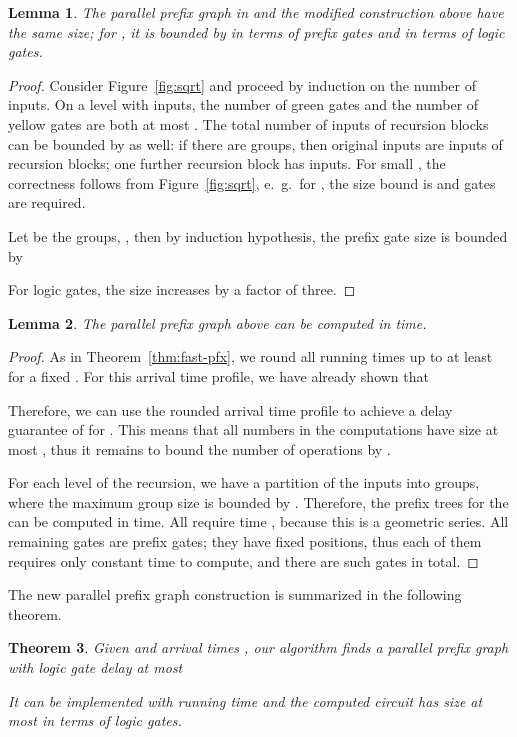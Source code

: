 \documentclass[11pt,final,microtype]{scrartcl}
\theoremstyle{plain}
\newtheorem{theorem}{Theorem}[section]
\newtheorem{lemma}[theorem]{Lemma}
\theoremstyle{definition}
\theoremstyle{remark}
\begin{document}
\begin{lemma} \label{lem:bl-ppfx-size-app}
  The parallel prefix graph in \cite{bonn2} and the modified
  construction above  have the same size; for
  , it is bounded by  in terms of prefix gates
  and  in terms of logic gates.
\end{lemma}
\begin{proof}
  Consider Figure~\ref{fig:sqrt} and proceed by induction on the
  number of inputs. On a level with  inputs, the number of green
  gates and the number of yellow gates are both at most . The total
  number of inputs of recursion blocks can be bounded by  as well:
  if there are  groups, then  original inputs are inputs of
  recursion blocks; one further recursion block has  inputs. For
  small , the correctness follows from Figure~\ref{fig:sqrt}, e.\
  g.\ for , the size bound is  and  gates are required.

  Let  be the groups, , then by induction
  hypothesis, the prefix gate size is bounded by
  
  For logic gates, the size increases by a factor of three. 
\end{proof}

\begin{lemma} \label{lem:rt-app}
  The parallel prefix graph above can be
  computed in  time. 
\end{lemma}
\begin{proof}
  As in Theorem~\ref{thm:fast-pfx}, we round all running times up to
  at least  for a fixed . For this arrival time profile, we have already shown that
  
  Therefore, we can use the rounded arrival time profile to achieve a
  delay guarantee of 
   for . This means that all numbers in the computations have size at
  most , thus it remains to bound the number of
  operations by . 

  For each level  of the recursion, we have a
  partition of the  inputs into groups, where the maximum group
  size is bounded by . Therefore, the prefix trees for the
   can be computed in 
  time. All  require time , because this
  is a geometric series. All remaining gates are prefix gates; they
  have fixed positions, thus each of them requires only constant time
  to compute, and there are  such gates in
  total.
\end{proof}

The new parallel prefix graph construction is summarized in the
following theorem.
\begin{theorem} \label{thm:my-ppfx} Given  and
  arrival times , our algorithm
  finds a parallel prefix graph with logic gate delay at most

It can be implemented with running time  and
the computed circuit has size at most  in terms of logic gates. 
\end{theorem}
\end{document}
